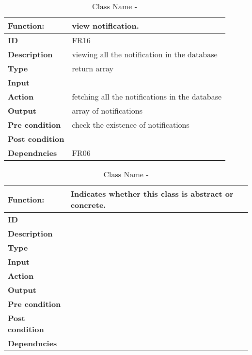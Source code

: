 \documentclass[]{article}
\begin{document}
\FloatBarrier
\begin{table}[h]
\caption{Class Name - }
\label{tab:my-table}
\begin{tabular}{|p{}|p{}|}
\hline
\textbf{Function:} & view notification.
\\ \hline
\textbf{ID}  & FR16           

\\ \hline
\textbf{Description}    & viewing all the notification in the database                                                                    
\\ \hline
\textbf{Type}    & return array       

\\ \hline
\textbf{Input}        & 


\\ \hline
\textbf{Action}            & fetching all the notifications in the database

\\ \hline
\textbf{Output}            & array of notifications

\\ \hline
\textbf{Pre condition}           & check the existence of notifications 

\\ \hline
\textbf{Post condition}           & 


\\ \hline
\textbf{Dependncies}           & FR06
\\ \hline
\end{tabular}
\end{table}

\FloatBarrier
\begin{table}[h]
\caption{Class Name - }
\label{tab:my-table}
\begin{tabular}{|p{}|p{}|}
\hline
\textbf{Function:} & Indicates whether this class is abstract or concrete.
\\ \hline
\textbf{ID}  &            

\\ \hline
\textbf{Description}    &                                                                     
\\ \hline
\textbf{Type}    &         

\\ \hline
\textbf{Input}        & 


\\ \hline
\textbf{Action}            & 

\\ \hline
\textbf{Output}            & 

\\ \hline
\textbf{Pre condition}           &   

\\ \hline
\textbf{Post condition}           & 


\\ \hline
\textbf{Dependncies}           & 
\\ \hline
\end{tabular}
\end{table}
\end{document}
